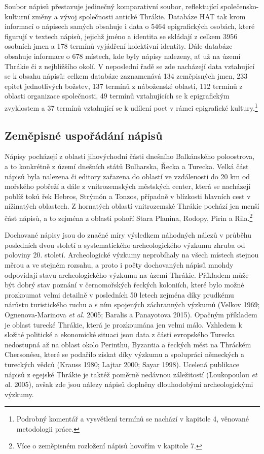 Soubor nápisů přestavuje jedinečný komparativní soubor, reflektující společensko-kulturní změny a vývoj společnosti antické Thrákie. Databáze HAT tak krom informací o nápisech samých obsahuje i data o 5464 epigrafických osobách, které figurují v textech nápisů, jejichž jméno a identita se skládají z celkem 3956 osobních jmen a 178 termínů vyjádření kolektivní identity. Dále databáze obsahuje informace o 678 místech, kde byly nápisy nalezeny, ať už na území Thrákie či z nejbližšího okolí. V neposlední řadě se zde nacházejí data vztahující se k obsahu nápisů: celkem databáze zaznamenává 134 zeměpisných jmen, 233 epitet jednotlivých božstev, 137 termínů z náboženské oblasti, 112 termínů z oblasti organizace společnosti, 49 termínů vztahujících se k epigrafickým zvyklostem a 37 termínů vztahující se k udílení poct v rámci epigrafické kultury.\footnote{Podrobný komentář a vysvětlení termínů se nachází v kapitole 4, věnované metodologii práce.}

\subsection[zeměpisné-uspořádání-nápisů]{Zeměpisné uspořádání nápisů}

Nápisy pocházejí z oblasti jihovýchodní části dnešního Balkánského poloostrova, a to konkrétně z území dnešních států Bulharska, Řecka a Turecka. Velká část nápisů byla nalezena či editory zařazena do oblastí ve vzdálenosti do 20 km od mořského pobřeží a dále z vnitrozemských městských center, která se nacházejí poblíž toků řek Hebros, Strýmón a Tonzos, případně v blízkosti hlavních cest v nížinatých oblastech. Z hornatých oblastí vnitrozemské Thrákie pochází jen menší část nápisů, a to zejména z oblasti pohoří Stara Planina, Rodopy, Pirin a Rila.\footnote{Více o zeměpisném rozložení nápisů hovořím v kapitole 7.}

Dochované nápisy jsou do značné míry výsledkem náhodných nálezů v průběhu posledních dvou století a systematického archeologického výzkumu zhruba od poloviny 20. století. Archeologické výzkumy neprobíhaly na všech místech stejnou měrou a ve stejném rozsahu, a proto i počty dochovaných nápisů mnohdy odpovídají stavu archeologického výzkumu na území Thrákie. Příkladem může být dobrý stav poznání v černomořských řeckých koloniích, které bylo možné prozkoumat velmi detailně v posledních 50 letech zejména díky prudkému nárůstu turistického ruchu a s ním spojených záchranných výzkumů (Velkov 1969; Ognenova-Marinova {\em et al.} 2005; Baralis a Panayotova 2015). Opačným příkladem je oblast turecké Thrákie, která je prozkoumána jen velmi málo. Vzhledem k složité politické a ekonomické situaci jsou data z části evropského Turecka nedostupná až na oblast okolo Perinthu, Byzantia a řeckých měst na Thráckém Chersonésu, které se podařilo získat díky výzkumu a spolupráci německých a tureckých vědců (Krauss 1980; Lajtar 2000; Sayar 1998). Ucelená publikace nápisů z egejské Thrákie je taktéž poměrně nedávnou záležitostí (Loukopoulou {\em et a}l. 2005), avšak zde jsou nálezy nápisů doplněny dlouhodobými archeologickými výzkumy.

